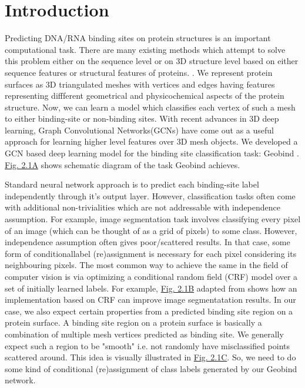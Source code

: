 \section{Introduction} Predicting DNA/RNA binding sites on protein structures is an important
computational task.  There are many existing methods which attempt to solve this problem either on
the sequence level or on 3D structure level based on either sequence features or structural features
of proteins. . We  represent protein surfaces as 3D triangulated meshes with 
vertices and edges having features representing diffferent geometrical and physicochemical aspects
of the protein structure. Now, we can learn a model which classifies each vertex of such a mesh to either binding-site or
non-binding sites. With recent advances in 3D deep learning, Graph Convolutional
Networks(GCNs) have come out as a useful approach for learning higher level features over
3D mesh objects. We developed a GCN based deep learning model for the binding site classification
task: Geobind . \hyperref[fig:crf_concept]{Fig. 2.1A} shows schematic diagram of
the task Geobind achieves.

Standard neural network approach is to predict each binding-site label independently
through it's output layer. However, classification tasks often come with additional non-trivialities which
are not addressable with independence assumption.  For example, image segmentation task involves
classifying every pixel of an image (which can be thought of as a grid of pixels) to some class.
However, independence assumption often gives poor/scattered results. In that case, some form of
conditionallabel (re)assignment is necessary for each pixel considering its neighbouring pixels. The
most common way to achieve the same in the field of computer vision is via optimizing a conditional
random  field (CRF) model over a set of initially  learned labels. For example,
\hyperref[fig:crf_concept]{Fig. 2.1B} adapted
from \citet{krahenbuhl2012efficient}  shows how an implementation based on CRF can improve image
segmentatation results. In our case, we also expect certain properties from a predicted binding site
region on a protein surface. A binding site region on a protein surface is basically a combination
of multiple mesh vertices predicted as binding site. We generally expect such a region to be
"smooth" i.e. not randomly have misclassified points scattered around. This idea is visually illustrated in
\hyperref[fig:crf_concept]{Fig. 2.1C}. So, we need to do some kind
of conditional (re)assignment of class labels generated by our Geobind network.

